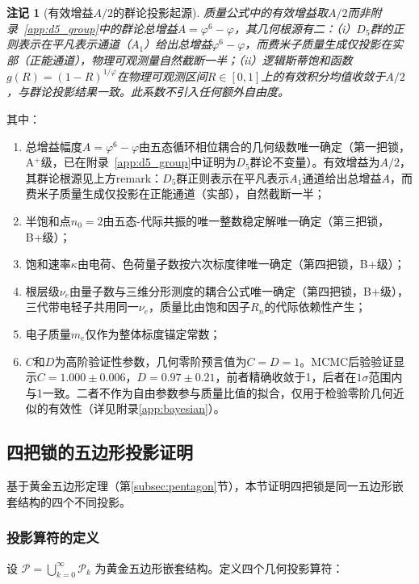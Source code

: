 \documentclass[12pt,a4paper,twocolumn]{article}
\renewcommand{\phi}{\varphi}
\newtheorem{remark}[theorem]{注记}
\begin{document}
\begin{remark}[有效增益$A/2$的群论投影起源]
质量公式中的有效增益取$A/2$而非附录~\ref{app:d5_group}中的群论总增益$A=\phi^6-\phi$，其几何根源有二：（i）$D_5$群的正则表示在平凡表示通道（$A_1$）给出总增益$\phi^6-\phi$，而费米子质量生成仅投影在实部（正能通道），物理可观测量自然截断一半；（ii）逻辑斯蒂饱和函数$g(R)=(1-R)^{1/\phi}$在物理可观测区间$R\in[0,1]$上的有效积分均值收敛于$A/2$，与群论投影结果一致。此系数不引入任何额外自由度。
\end{remark}

其中：
\begin{enumerate}
\item 总增益幅度$A = \phi^6-\phi$由五态循环相位耦合的几何级数唯一确定（第一把锁，A$^+$级，已在附录~\ref{app:d5_group}中证明为$D_5$群论不变量）。有效增益为$A/2$，其群论根源见上方remark：$D_5$群正则表示在平凡表示$A_1$通道给出总增益$A$，而费米子质量生成仅投影在正能通道（实部），自然截断一半；
\item 半饱和点$n_0 = 2$由五态-代际共振的唯一整数稳定解唯一确定（第三把锁，B+级）；
\item 饱和速率$\kappa$由电荷、色荷量子数按六次标度律唯一确定（第四把锁，B+级）；
\item 根层级$\nu_e$由量子数与三维分形测度的耦合公式唯一确定（第四把锁，B+级），三代带电轻子共用同一$\nu_e$，质量比由饱和因子$R_n$的代际依赖性产生；
\item 电子质量$m_e$仅作为整体标度锚定常数；
\item $C$和$D$为高阶验证性参数，几何零阶预言值为$C=D=1$。MCMC后验验证显示$C=1.000\pm0.006$，$D=0.97\pm0.21$，前者精确收敛于1，后者在$1\sigma$范围内与1一致。二者不作为自由参数参与质量比值的拟合，仅用于检验零阶几何近似的有效性（详见附录\ref{app:bayesian}）。
\end{enumerate}

\subsection{四把锁的五边形投影证明}
\label{subsec:four_locks_pentagon}

基于黄金五边形定理（第\ref{subsec:pentagon}节），本节证明四把锁是同一五边形嵌套结构的四个不同投影。

\subsubsection{投影算符的定义}

设 $\mathcal{P} = \bigcup_{k=0}^\infty \mathcal{P}_k$ 为黄金五边形嵌套结构。定义四个几何投影算符：
\end{document}
